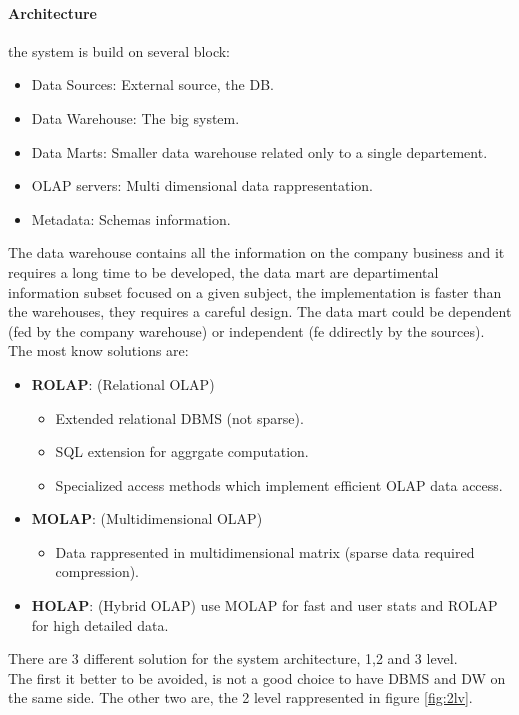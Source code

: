 \documentclass[12pt]{article}
\begin{document}
\paragraph{Architecture} the system is build on several block:
\begin{itemize}
  \item Data Sources: External source, the DB.
  \item Data Warehouse: The big system.
  \item Data Marts: Smaller data warehouse related only to a single departement.
  \item OLAP servers: Multi dimensional data rappresentation.
  \item Metadata: Schemas information.
\end{itemize}
The data warehouse contains all the information on the company business and it requires a long time to be developed, the data mart are departimental information subset focused on a given subject, the implementation is faster than the warehouses, they requires a careful design. The data mart could be dependent (fed by the company warehouse) or independent (fe ddirectly by the sources). The most know solutions are:
\begin{itemize}
  \item \textbf{ROLAP}: (Relational OLAP)
  \begin{itemize}
    \item Extended relational DBMS (not sparse).
    \item SQL extension for aggrgate computation.
    \item Specialized access methods which implement efficient OLAP data access.
  \end{itemize}
  \item \textbf{MOLAP}: (Multidimensional OLAP)
  \begin{itemize}
    \item Data rappresented in multidimensional matrix (sparse data required compression).
  \end{itemize}
  \item \textbf{HOLAP}: (Hybrid OLAP) use MOLAP for fast and user stats and ROLAP for high detailed data.
\end{itemize}
There are 3 different solution for the system architecture, 1,2 and 3 level.\\
The first it better to be avoided, is not a good choice to have DBMS and DW on the same side. The other two are, the 2 level rappresented in figure \ref{fig:2lv}.
\end{document}
